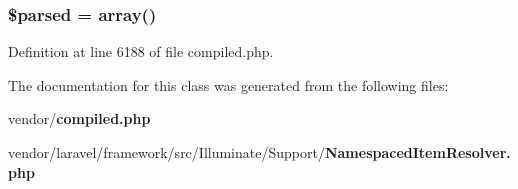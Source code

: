\subsubsection[{\$parsed}]{\setlength{\rightskip}{0pt plus 5cm}\$parsed = array()\hspace{0.3cm}{\ttfamily [protected]}}\label{class_illuminate_1_1_support_1_1_namespaced_item_resolver_a88925ebaf6173a1412197d8134d0a0a6}


Definition at line 6188 of file compiled.\+php.



The documentation for this class was generated from the following files\+:\begin{DoxyCompactItemize}
\item 
vendor/{\bf compiled.\+php}\item 
vendor/laravel/framework/src/\+Illuminate/\+Support/{\bf Namespaced\+Item\+Resolver.\+php}\end{DoxyCompactItemize}
